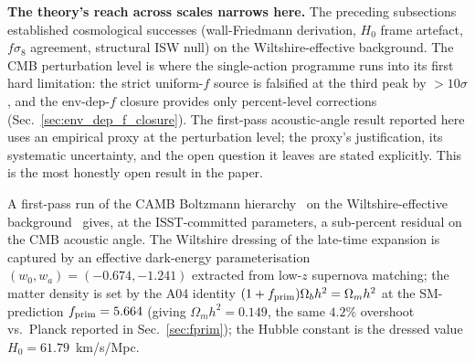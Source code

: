 \documentclass[aps,prd,twocolumn,nofootinbib,floatfix,superscriptaddress]{revtex4-2}
\newcommand{\fprim}{f_{\rm prim}}
\begin{document}
\textbf{The theory's reach across scales narrows here.} The
preceding subsections established cosmological successes
(wall-Friedmann derivation, $H_0$ frame artefact, $f\sigma_8$
agreement, structural ISW null) on the Wiltshire-effective
background. The CMB perturbation level is where the
single-action programme runs into its first hard limitation: the
strict uniform-$f$ source is falsified at the third peak by
$>10\sigma$, and the env-dep-$f$ closure provides only
percent-level corrections (Sec.~\ref{sec:env_dep_f_closure}).
The first-pass acoustic-angle result reported here uses an
empirical proxy at the perturbation level; the proxy's
justification, its systematic uncertainty, and the open question
it leaves are stated explicitly. This is the most honestly open
result in the paper.

A first-pass run of the CAMB Boltzmann
hierarchy~\cite{LewisChallinor2011} on the Wiltshire-effective
background~\cite{Wiltshire2007,Wiltshire2009,Dam2017} gives, at the
ISST-committed parameters, a sub-percent residual on the CMB
acoustic angle. The Wiltshire dressing of the late-time expansion is
captured by an effective dark-energy parameterisation
$(w_0, w_a) = (-0.674, -1.241)$ extracted from low-$z$ supernova
matching; the matter density is set by the A04 identity
$(1+\fprim)\Omega_b h^2 = \Omega_m h^2$ at the SM-prediction
$\fprim = 5.664$ (giving $\Omega_m h^2 = 0.149$, the same $4.2\%$
overshoot vs.\ Planck reported in Sec.~\ref{sec:fprim}); the Hubble
constant is the dressed value $H_0 = 61.79$~km/s/Mpc.
\end{document}

